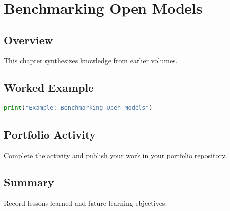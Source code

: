 \chapter{Benchmarking Open Models}
\label{chap:vol15-2}



\section{Overview}
This chapter synthesizes knowledge from earlier volumes.

\section{Worked Example}
\begin{lstlisting}[language=Python]
print("Example: Benchmarking Open Models")
\end{lstlisting}

\section{Portfolio Activity}
Complete the activity and publish your work in your portfolio repository.

\section{Summary}
Record lessons learned and future learning objectives.
